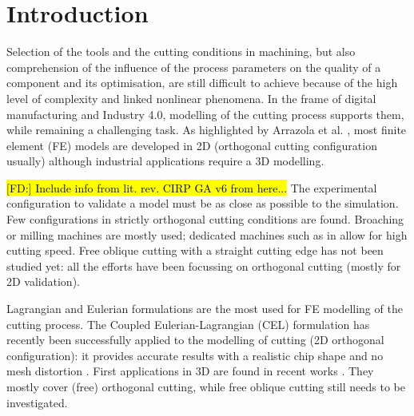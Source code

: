 \documentclass[final,5p,times,twocolumn]{elsarticle}
\DeclareRobustCommand{\FD}[1]{ {\begingroup\sethlcolor{VWgreen}\textcolor{black}{\hl{[FD:] #1}}\endgroup} }
\begin{document}
\section{Introduction}
\label{Intro}

Selection of the tools and the cutting conditions in machining, but also comprehension of the influence of the process parameters on the quality of a component and its optimisation, are still difficult to achieve because of the high level of complexity and linked nonlinear phenomena. In the frame of digital manufacturing and Industry 4.0, modelling of the cutting process supports them, while remaining a challenging task. As highlighted by Arrazola et al. \cite{arrazola_recent_2013}, most finite element (FE) models are developed in 2D (orthogonal cutting configuration usually) although industrial applications require a 3D modelling.

\FD{Include info from lit. rev. CIRP GA v6 from here...}The experimental configuration to validate a model must be as close as possible to the simulation. Few configurations in strictly orthogonal cutting conditions are found. Broaching \cite{abouridouane_friction_2021} or milling \cite{sela_measurement_2021, ducobu_experimental_2015} machines are mostly used; dedicated machines such as in \cite{afrasiabi_numerical-experimental_2021} allow for high cutting speed. Free oblique cutting with a straight cutting edge has not been studied yet: all the efforts have been focussing on orthogonal cutting (mostly for 2D validation).

Lagrangian and Eulerian formulations are the most used for FE modelling of the cutting process. The Coupled Eulerian-Lagrangian (CEL) formulation has recently been successfully applied to the modelling of cutting (2D orthogonal configuration): it provides accurate results with a realistic chip shape and no mesh distortion \cite{ducobu_application_2016}. First applications in 3D are found in recent works \cite{xu_simulation_2021, ducobu_finite_2017, ambrosio_new_2022, vovk_finite_2020, hardt_three_2021}. They mostly cover (free) orthogonal cutting, while free oblique cutting still needs to be investigated.
\end{document}

